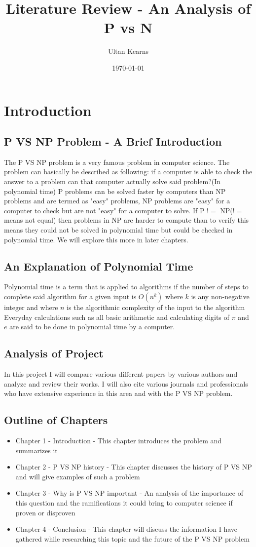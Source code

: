 \documentclass{report}
\title{Literature Review - An Analysis of P vs N}
\author{Ultan Kearns}
\date{\today}
\begin{document}
\maketitle
\tableofcontents
\chapter{Introduction}
\section{P VS NP Problem - A Brief Introduction}
The P VS NP problem is a very famous problem in computer science.  The problem
can basically be described as following: if a computer is able to check the answer
to a problem can that computer actually solve said problem?(In polynomial time)\cite{wiki}  P problems can be
solved faster by computers than NP problems and are termed as "easy" problems, NP problems
are "easy" for a computer to check but are not "easy" for a computer to solve.\cite{wiki}
If P $!=$ NP($!=$ means not equal) then problems in NP are harder to compute than to verify
this means they could not be solved in polynomial time but could be checked in polynomial time.  We will explore this more in later chapters.
\section{An Explanation of Polynomial Time}
Polynomial time is a term that is applied to algorithms if the number of steps
to complete said algorithm for a given input is $O(n^k)$ where $k$ is any non-negative
integer and where $n$ is the algorithmic complexity of the input to the algorithm \cite{polynomial}
Everyday calculations such as all basic arithmetic and calculating digits of $\pi$ and $e$ are said
to be done in polynomial time by a computer\cite{polynomial}.
\section{Analysis of Project}
In this project I will compare various different papers by various authors and
analyze and review their works.  I will also cite various journals and professionals
who have extensive experience in this area and with the P VS NP problem.
\section{Outline of Chapters}
\begin{itemize}
  \item Chapter 1 - Introduction - This chapter introduces the problem and summarizes it
  \item  Chapter 2 - P VS NP history - This chapter discusses the history of P VS NP and will give examples of such a problem
  \item Chapter 3 - Why is P VS NP important - An analysis of the importance of this question and the ramifications it could bring to computer science if proven or disproven
  \item Chapter 4 - Conclusion - This chapter will discuss the information I have gathered while researching this topic and the future of the P VS NP problem
\end{itemize}
\end{document}
